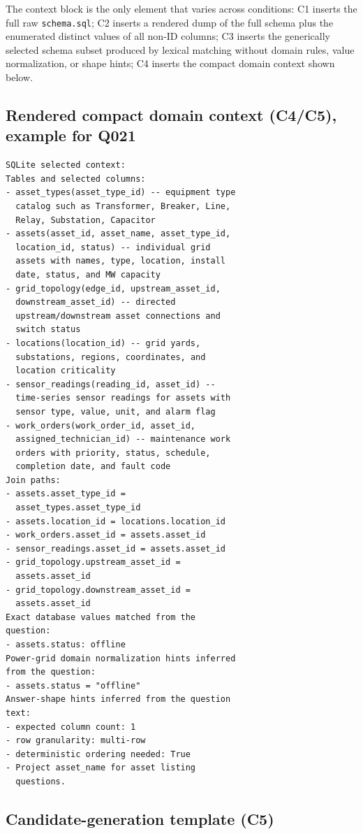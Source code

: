 \documentclass{ieeeaccess}
\begin{document}
The context block is the only element that varies across conditions: C1 inserts the full raw \texttt{schema.sql}; C2 inserts a rendered dump of the full schema plus the enumerated distinct values of all non-ID columns; C3 inserts the generically selected schema subset produced by lexical matching without domain rules, value normalization, or shape hints; C4 inserts the compact domain context shown below.

\subsection{Rendered compact domain context (C4/C5), example for Q021}

\begin{small}
\begin{verbatim}
SQLite selected context:
Tables and selected columns:
- asset_types(asset_type_id) -- equipment type
  catalog such as Transformer, Breaker, Line,
  Relay, Substation, Capacitor
- assets(asset_id, asset_name, asset_type_id,
  location_id, status) -- individual grid
  assets with names, type, location, install
  date, status, and MW capacity
- grid_topology(edge_id, upstream_asset_id,
  downstream_asset_id) -- directed
  upstream/downstream asset connections and
  switch status
- locations(location_id) -- grid yards,
  substations, regions, coordinates, and
  location criticality
- sensor_readings(reading_id, asset_id) --
  time-series sensor readings for assets with
  sensor type, value, unit, and alarm flag
- work_orders(work_order_id, asset_id,
  assigned_technician_id) -- maintenance work
  orders with priority, status, schedule,
  completion date, and fault code
Join paths:
- assets.asset_type_id =
  asset_types.asset_type_id
- assets.location_id = locations.location_id
- work_orders.asset_id = assets.asset_id
- sensor_readings.asset_id = assets.asset_id
- grid_topology.upstream_asset_id =
  assets.asset_id
- grid_topology.downstream_asset_id =
  assets.asset_id
Exact database values matched from the
question:
- assets.status: offline
Power-grid domain normalization hints inferred
from the question:
- assets.status = "offline"
Answer-shape hints inferred from the question
text:
- expected column count: 1
- row granularity: multi-row
- deterministic ordering needed: True
- Project asset_name for asset listing
  questions.
\end{verbatim}
\end{small}

\subsection{Candidate-generation template (C5)}
\end{document}
